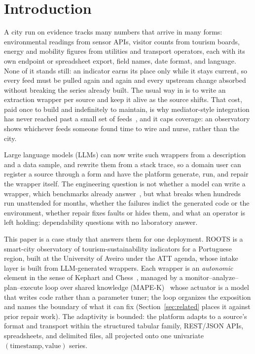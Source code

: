 \documentclass[conference]{IEEEtran}
\newcommand{\Sys}{ROOTS}
\begin{document}
\section{Introduction}
\label{sec:intro}

A city run on evidence tracks many numbers that arrive in many forms: environmental
readings from sensor APIs, visitor counts from tourism boards, energy and mobility
figures from utilities and transport operators, each with its own endpoint or
spreadsheet export, field names, date format, and language. None of it
stands still: an indicator earns its place only while it stays current, so every
feed must be pulled again and again and every upstream change absorbed without
breaking the series already built. The usual way in is to write an extraction
wrapper per source and keep it alive as the source shifts. That cost, paid once to
build and indefinitely to maintain, is why mediator-style integration has never
reached past a small set of
feeds~\cite{wiederhold1992mediators,kushmerick2000wrapper,lerman2003wrapper}, and it
caps coverage: an observatory shows whichever feeds someone found time to wire and
nurse, rather than the city.

Large language models (LLMs) can now write such wrappers from a description and a
data sample, and rewrite them from a stack trace, so a domain user can register a
source through a form and have the platform generate, run, and repair the wrapper
itself. The engineering question is not whether a model can write a wrapper, which
benchmarks already answer~\cite{arora2023evaporate,huang2024autoscraper}, but what
breaks when hundreds run unattended for months, whether the failures indict the
generated code or the environment, whether repair fixes faults or hides them, and
what an operator is left holding: dependability questions with no laboratory answer.

This paper is a case study that answers them for one deployment. \Sys{} is a
smart-city observatory of tourism-sustainability indicators for a Portuguese region,
built at the University of Aveiro under the ATT agenda, whose intake layer is built
from LLM-generated wrappers. Each wrapper is an \emph{autonomic} element in the sense of
Kephart and Chess~\cite{kephart2003vision}, managed by a monitor--analyze--plan--execute
loop over shared knowledge (MAPE-K)~\cite{ibm2005blueprint,huebscher2008autonomic}
whose actuator is a model that writes code rather than a parameter tuner; the loop
organizes the exposition and names the boundary of what it can fix
(Section~\ref{sec:related} places it against prior repair work). The adaptivity is
bounded: the platform adapts to a source's format and transport within the structured tabular
family, REST/JSON APIs, spreadsheets, and delimited files, all projected onto one
univariate $(\textrm{timestamp}, \textrm{value})$ series.
\end{document}
